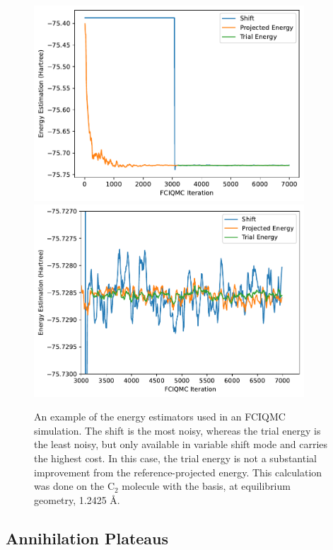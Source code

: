 \begin{figure}[htbp]
    \centering
    \includegraphics[width=0.9\textwidth]{figures/qmc/c2_example.pdf}
    \includegraphics[width=0.9\textwidth]{figures/qmc/c2_example_zoomed.pdf}
    \caption{An example of the energy estimators used in an FCIQMC simulation. The shift is the most noisy, whereas the trial energy is the least noisy, but only available in variable shift mode and carries the highest cost. In this case, the trial energy is not a substantial improvement from the reference-projected energy. This calculation was done on the C$_2$ molecule with the \vdz basis, at equilibrium geometry, 1.2425 \AA.}
    \label{fig:fciqmc_energy_estimators}
\end{figure}

\subsection{Annihilation Plateaus}

